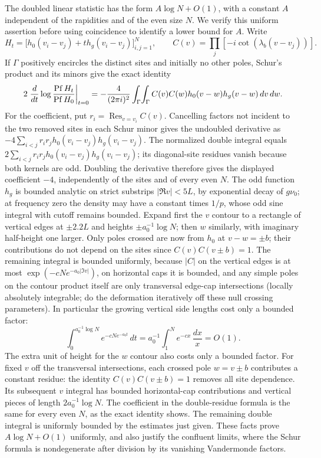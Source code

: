 The doubled linear statistic has the form $A\log N+O(1)$, with a constant $A$ independent of the rapidities and of the even size $N$. We verify this uniform assertion before using coincidence to identify a lower bound for $A$. Write
\[
 H_t=\big[h_0(v_i-v_j)+t h_g(v_i-v_j)\big]_{i,j=1}^N,
 \qquad C(v)=\prod_j[-i\cot(\lambda_b(v-v_j))].
\]
If $\Gamma$ positively encircles the distinct sites and initially no
other poles, Schur's product and its minors give the exact identity
\[
 2\left.\frac{d}{dt}\log\frac{\operatorname{Pf} H_t}{\operatorname{Pf} H_0}\right|_{t=0}
 =-\frac4{(2\pi i)^2}\int_\Gamma\!\int_\Gamma
 C(v)C(w)h_0(v-w)h_g(v-w)\,dv\,dw.
\]
For the coefficient, put $r_i=\operatorname{Res}_{v=v_i}C(v)$.
Cancelling factors not incident to the two removed sites in each Schur
minor gives the undoubled derivative as
$-4\sum_{i<j}r_i r_j h_0(v_i-v_j)h_g(v_i-v_j)$.
The normalized double integral equals
$2\sum_{i<j}r_i r_j h_0(v_i-v_j)h_g(v_i-v_j)$; its diagonal-site
residues vanish because both kernels are odd. Doubling the derivative
therefore gives the displayed coefficient $-4$, independently of the
sites and of every even $N$. The odd function \(h_g\) is bounded analytic on strict substrips \(|\Re v|<5L\), by exponential decay of \(g\nu_0\); at frequency zero the density may have a constant times \(1/p\), whose odd sine integral with cutoff remains bounded. Expand first the \(v\) contour to a rectangle of vertical edges at \(\pm2.2L\) and heights \(\pm a_0^{-1}\log N\); then \(w\) similarly, with imaginary half-height one larger. Only poles crossed are now from \(h_0\) at \(v-w=\pm b\); their contributions do not depend on the sites since \(C(v)C(v\pm b)=1\). The remaining integral is bounded uniformly, because \(|C|\) on the vertical edges is at most \(\exp(-cN e^{-a_0|\Im v|})\), on horizontal caps it is bounded, and any simple poles on the contour product itself are only transversal edge-cap intersections (locally absolutely integrable; do the deformation iteratively off these null crossing parameters). In particular the growing vertical side lengths cost only a bounded factor:
\[
 \int_0^{a_0^{-1}\log N}e^{-cN e^{-a_0t}}\,dt
 =a_0^{-1}\int_1^N e^{-cx}\,\frac{dx}{x}=O(1).
\]
The extra unit of height for the $w$ contour also costs only a bounded
factor. For fixed $v$ off the transversal intersections, each crossed pole
$w=v\pm b$ contributes a constant residue: the identity
$C(v)C(v\pm b)=1$ removes all site dependence.  Its subsequent $v$
integral has bounded horizontal-cap contributions and vertical pieces
of length $2a_0^{-1}\log N$.  The coefficient in the double-residue formula is the same for every
even $N$, as the exact identity shows. The remaining double integral
is uniformly bounded by the estimates just given.  These facts prove $A\log N+O(1)$ uniformly,
and also justify the confluent limits, where the Schur formula is
nondegenerate after division by its vanishing Vandermonde factors.

